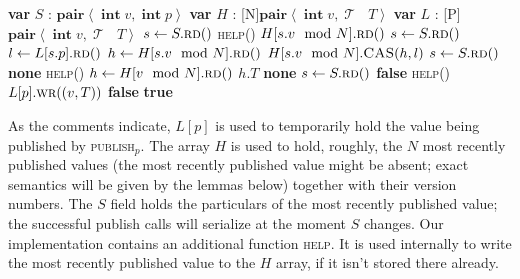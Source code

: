 \documentclass[a4paper,11pt]{article}
\def\none{\textbf{none} }
\def\T{\ensuremath{\operatorname{\mathcal{T}}}\text{ }}
\def\int{\ensuremath{\operatorname{\textbf{int}}}}
\newcommand{\fn}[1]{\textsc{#1}}
\newcommand{\var}[2]{\textbf{var }#1 : #2}
\newcommand{\arrayspec}[1]{\text{array}[#1]\text{ of }}
\begin{document}
\begin{algorithmic}[1]
	\State\var{$S$}{$\textbf{pair}\left<\int v, \int p\right>$} 
	\State\var{$H$}{\arrayspec{N}$\textbf{pair}\left<\int v, \T T\right>$} 
	\State\var{$L$}{\arrayspec{P}$\textbf{pair}\left<\int v, \T T\right>$} 
	\filbreak
		\State $s \gets S.\fn{rd}()$ 
		\State \fn{help}()
		\State \Return $H[s.v \mod N].\fn{rd}()$
	\EndFunction
	\filbreak
	 
		\State $s \gets S.\fn{rd}()$
		\State $l \gets L[s.p].\fn{rd}()$
		\State $h \gets H[s.v \mod N].\fn{rd}()$
			\State $H[s.v \mod N].\fn{CAS}(h, l)$ \label{hist-help-cas}
		\EndIf
	\EndFunction
	\filbreak
		\State $s \gets S.\fn{rd}()$ \label{hist-get-notyet-sp} 
			\State \Return \none \label{hist-get-notyet} 
		\EndIf
		\State \fn{help}()
		\State $h \gets H[v \mod N].\fn{rd}()$
			\State \Return $h.T$
		\Else
			\State \Return \none \label{hist-get-tooold}
		\EndIf
	\EndFunction
	\filbreak
		\State $s \gets S.\fn{rd}()$ \label{hist-pub-earlier-sp} 
			\State \Return \textbf{false} \label{hist-pub-earlier-exit}
		\EndIf
		\State \fn{help}()
		\State $L[p].\fn{wr}((v, T))$ \label{hist-pub-latest}
		\If{$S.\fn{CAS}(s, (v, p)$) \textbf{failed}} \label{hist-pub-later-sp}
			\State \Return \textbf{false}
		\EndIf
		\State \Return \textbf{true}
	\EndFunction
\end{algorithmic}

As the comments indicate, $L[p]$ is used to temporarily hold the value being published by \fn{publish$_p$}. The array $H$ is used to hold, roughly,
the $N$ most recently published values (the most recently published value might be absent; exact semantics will be given by the lemmas below) together with their version numbers. The $S$ field holds the particulars of the most recently published value; the successful publish calls will serialize at the moment $S$ changes. Our implementation contains an additional function \fn{help}. It is used internally to write the most recently published value to the $H$ array, if it isn't stored there already.
\end{document}
